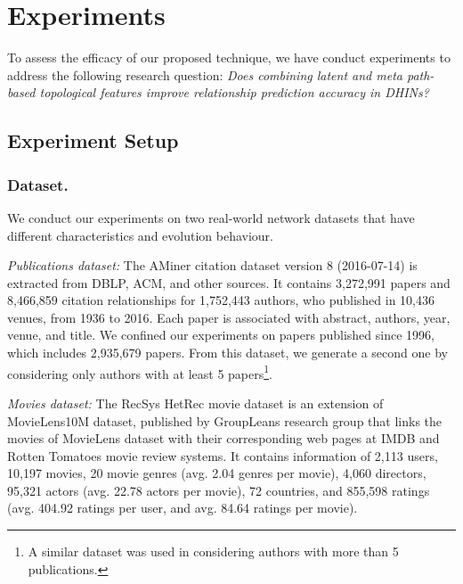 \section{Experiments}

To assess the efficacy of our proposed technique, we have conduct experiments to address the following research question: \textit{Does combining latent and meta path-based topological features improve relationship prediction accuracy in DHINs?}


\subsection{Experiment Setup}

\subsubsection{Dataset.} We conduct our experiments on two real-world network datasets that have different characteristics and evolution behaviour. 

\textit{Publications dataset:} The AMiner citation dataset \cite{Tang:08KDD} version 8 (2016-07-14) is extracted from DBLP, ACM, and other sources. It contains 3,272,991 papers and 8,466,859 citation relationships for 1,752,443 authors, who published in 10,436 venues, from 1936 to 2016. Each paper is associated with abstract, authors, year, venue, and title. We confined our experiments on papers published since 1996, which includes 2,935,679 papers. From this dataset, we generate a second one by considering only authors with at least 5 papers\footnote{A similar dataset was used in \cite{sun2011ASONAM} considering authors with more than 5 publications.}.    
    
\textit{Movies dataset:} The RecSys HetRec movie dataset \cite{Cantador:RecSys2011} is an extension of MovieLens10M dataset, published by GroupLeans research group that links the movies of MovieLens dataset with their corresponding web pages at IMDB and Rotten Tomatoes movie review systems. It contains information of 2,113 users, 10,197 movies, 20 movie genres (avg. 2.04 genres per movie), 4,060 directors, 95,321 actors (avg. 22.78 actors per movie), 72 countries, and 855,598 ratings (avg. 404.92 ratings per user, and avg. 84.64 ratings per movie).%


